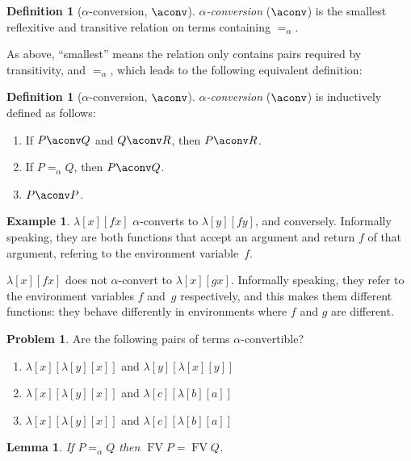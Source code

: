 \documentclass[10pt,a4paper]{article}
\theoremstyle{plain}
\newtheorem{lem}[thm]{Lemma}
\theoremstyle{definition}
\newtheorem{defn}[thm]{Definition}
\newtheorem{ex}[thm]{Example}
\newtheorem{prob}{Problem}[section]
\theoremstyle{remark}
\newcommand*{\ollabel}[1]{\label{#1}}
\providecommand{\lambd}{\ensuremath{\lambda}}
\providecommand{\FV}{\operatorname{FV}}
\providecommand{\aconvone}{\mathrel{=_\alpha}}
\providecommand{\FV}{\operatorname{FV}}
\begin{document}
\begin{defn}[$\alpha$-conversion, $\aconv$]
  \emph{$\alpha$-conversion} ($\aconv$) is the smallest reflexitive
  and transitive relation on terms containing $\aconvone$.
\end{defn}

As above, ``smallest'' means the relation only contains pairs required
by transitivity, and $\aconvone$, which leads to the following
equivalent definition:

\begin{defn}[$\alpha$-conversion, $\aconv$] \ollabel{defn:aconv}
  \emph{$\alpha$-conversion} ($\aconv$) is inductively defined as follows:
  \begin{enumerate}
  \item If $P \aconv Q$ and $Q \aconv R$, then $P \aconv R$.
    \ollabel{defn:aconv1}
  \item If $P \aconvone Q$, then $P \aconv Q$. \ollabel{defn:aconv2}
  \item $P \aconv P$. \ollabel{defn:aconv3}
  \end{enumerate}
\end{defn}

\begin{ex}
  $\lambd[x][f x]$ $\alpha$-converts to $\lambd[y][f
  y]$, and conversely. Informally
  speaking, they are both functions that accept an argument and
  return $f$ of that argument, refering to the environment variable~$f$.

  $\lambd[x][f x]$ does not $\alpha$-convert to $\lambd[x][g
    x]$. Informally speaking, they refer to the environment variables
  $f$ and~$g$ respectively, and this makes them different functions: they
  behave differently in environments where $f$ and $g$ are different.
\end{ex}

\begin{prob}
  Are the following pairs of terms $\alpha$-convertible?
  \begin{enumerate}
  \item $\lambd[x][\lambd[y][x]]$ and $\lambd[y][\lambd[x][y]]$
  \item $\lambd[x][\lambd[y][x]]$ and $\lambd[c][\lambd[b][a]]$
  \item $\lambd[x][\lambd[y][x]]$ and $\lambd[c][\lambd[b][a]]$
  \end{enumerate}
\end{prob}

\begin{lem}\ollabel{lem:fv-one}
  If $P \aconvone Q$ then $\FV{P} = \FV{Q}$.
\end{lem}
\end{document}
